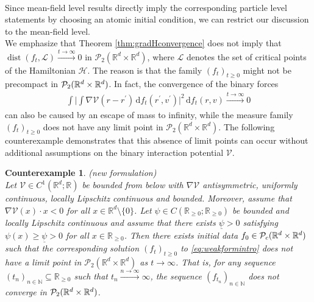 \documentclass[11pt]{article}
\newtheorem{counterexample}[theorem]{Counterexample}
\newcommand{\R}[0]{\mathbb R}
\newcommand{\N}[0]{\mathbb N}
\DeclareMathOperator{\dist}{dist}
\newcommand{\Pp}[1]{
    \ifx #1\infty
        \mathcal{P}_{c}
    \else 
        \mathcal{P}_{#1}
    \fi 
}
\newcommand{\msolt}[2]{f_{#1}(#2)}
\begin{document}
\begin{bibunit}[unsrtnat]
\begin{align*}
\end{align*}
Since mean-field level results directly imply the corresponding particle level statements by choosing an atomic initial condition, we can restrict our discussion to the mean-field level. \\
We emphasize that Theorem \ref{thm:gradHconvergence} does not imply that $\dist(f_t, \mathcal{L}) \stackrel{t \to \infty}{\to} 0$ in $\mathcal{P}_2(\R^d \times \R^d )$, where $\mathcal{L}$ denotes the set of critical points of the Hamiltonian $\mathcal{H}$. The reason is that the family $(f_t)_{t \geq 0}$ might not be precompact in $\Pp{2}(\R^d \times \R^d)$. In fact, the convergence of the binary forces 
\begin{align*}
    \int  \Big| \int \nabla \mathcal{V}(r-r^\prime) \, \mathrm{d} \msolt{t}{r^\prime,v^\prime} \Big|^2 \, \mathrm{d} \msolt{t}{r,v} \stackrel{t \to \infty}{\to } 0
\end{align*}
can also be caused by an escape of mass to infinity, while the measure family $(f_t)_{t \geq 0}$ does not have any limit point in $\mathcal{P}_2(\R^d \times \R^d)$.  The following counterexample demonstrates that this absence of limit points can occur without additional assumptions on the binary interaction potential $\mathcal{V}$.
\begin{counterexample}(new formulation)\label{Cornoncompactness} \\
        Let $\mathcal{V} \in C^{1}(\R^d; \R)$ be bounded from below with $\nabla \mathcal{V}$ antisymmetric, uniformly continuous, locally Lipschitz continuous and bounded. Moreover, assume that $\nabla \mathcal{V}(x) \cdot x < 0$ for all $x \in \R^d\setminus\{ 0 \}$. Let $\psi \in C(\R_{\geq 0}; \R_{\geq 0})$ be bounded and locally Lipschitz continuous and assume that there exists $\underline{\psi} > 0$ satisfying $\psi(x) \geq \underline{\psi} > 0$ for all $x \in \R_{\geq 0}$.  Then there exists initial data $f_0 \in \Pp{\infty} (\R^d \times \R^d)$ such that the corresponding solution $(f_t)_{t \geq 0}$ to \eqref{eq:weakformintro} does not have a limit point in $\mathcal{P}_2(\R^d \times \R^d)$ as $t \to \infty$. That is, for any sequence $(t_n)_{n \in \N} \subseteq \R_{\geq 0} $ such that $t_n \stackrel{n \to \infty}{\to} \infty$, the sequence $(f_{t_n})_{n \in \N}$ does not converge in $\Pp{2}(\R^d \times \R^d)$.
\end{counterexample}

\end{bibunit}
\end{document}
